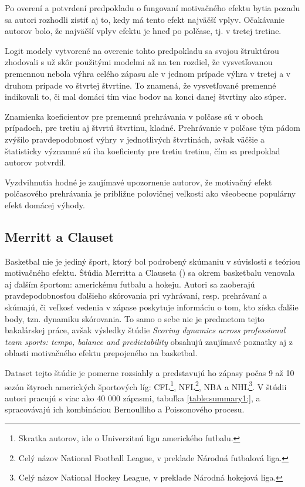 \documentclass[
  digital, %
  oneside, %
  notable,   %
  lof,     %
  lot,     %
]{fithesis3}
\begin{document}
		Po overení a potvrdení predpokladu o fungovaní motivačného efektu bytia pozadu sa autori rozhodli zistiť aj to, kedy má tento efekt najväčší vplyv. Očakávanie autorov bolo, že najväčší vplyv efektu je hneď po polčase, tj. v tretej tretine.
		
		Logit modely vytvorené na overenie tohto predpokladu sa svojou štruktúrou zhodovali s už skôr použitými modelmi až na ten rozdiel, že vysvetľovanou premennou nebola výhra celého zápasu ale v jednom prípade výhra v tretej a v druhom prípade vo štvrtej štvrtine. To znamená, že vysvetľované premenné indikovali to, či mal domáci tím viac bodov na konci danej štvrtiny ako súper. 
		
		Znamienka koeficientov pre premennú prehrávania v polčase sú v oboch prípadoch, pre tretiu aj štvrtú štvrtinu, kladné. Prehrávanie v polčase tým pádom zvýšilo pravdepodobnosť výhry v jednotlivých štvrtinách, avšak väčšie a štatisticky významné sú iba koeficienty pre tretiu tretinu, čím sa predpoklad autorov potvrdil. \parencite[s.~822]{berger2011}		
			
		Vyzdvihnutia hodné je zaujímavé upozornenie autorov, že motivačný efekt polčasového prehrávania je približne polovičnej veľkosti ako všeobecne populárny efekt domácej výhody.

		\subsection{Merritt a Clauset}
		Basketbal nie je jediný šport, ktorý bol podrobený skúmaniu v súvislosti s teóriou motivačného efektu. Štúdia Merritta a Clauseta (\citeyear{merritt2014}) sa okrem basketbalu venovala aj ďalším športom: americkému futbalu a hokeju. Autori sa zaoberajú pravdepodobnosťou ďalšieho skórovania pri vyhrávaní, resp. prehrávaní a skúmajú, či veľkosť vedenia v zápase poskytuje informáciu o tom, kto získa ďalšie body, tzn. dynamiku skórovania. To samo o sebe nie je predmetom tejto bakalárskej práce, avšak výsledky štúdie \textit{Scoring dynamics across professional team sports: tempo, balance and predictability} obsahujú zaujímavé poznatky aj z oblasti motivačného efektu prepojeného na basketbal.
		
		Dataset tejto štúdie je pomerne rozsiahly a predstavujú ho zápasy počas 9 až 10  sezón štyroch amerických športových líg: CFL\footnote{Skratka autorov, ide o Univerzitnú ligu amerického futbalu.}, NFL\footnote{Celý názov National Football League, v preklade Národná futbalová liga.}, NBA a NHL\footnote{Celý názov National Hockey League, v preklade Národná hokejová liga.}. V štúdii autori pracujú s viac ako 40 000 zápasmi, tabuľka \ref{table:summary1;}, a spracovávajú ich kombináciou Bernoulliho a Poissonového procesu.
	
\end{document}
